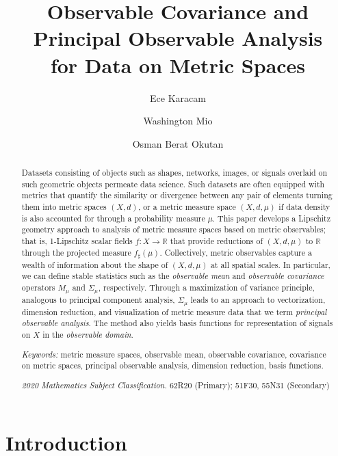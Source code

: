\documentclass[11pt]{article}
\theoremstyle{definition}
\newcommand{\real}{\ensuremath{\mathbb{R}}}
\begin{document}
\title{Observable Covariance and Principal Observable Analysis \\ for Data on Metric Spaces}
\author[1]{Ece Karacam}
\author[1]{Washington Mio}
\author[2]{Osman Berat Okutan}
\date{ }

\maketitle

\begin{abstract}
Datasets consisting of objects such as shapes, networks, images, or signals overlaid on such geometric objects permeate data science. Such datasets are often equipped with metrics that quantify the similarity or divergence between any pair of elements turning them into metric spaces $(X,d)$, or a metric measure space $(X,d,\mu)$ if data density is also accounted for through a probability measure $\mu$. This paper develops a Lipschitz geometry approach to analysis of metric measure spaces based on metric observables; that is, 1-Lipschitz scalar fields $f \colon X \to \real$ that provide reductions of $(X,d,\mu)$ to $\real$ through the projected measure $f_\sharp (\mu)$. Collectively, metric observables capture a wealth of information about the shape of $(X,d,\mu)$ at all spatial scales. In particular, we can define stable statistics such as the {\em observable mean} and {\em observable covariance} operators $M_\mu$ and $\Sigma_\mu$, respectively. Through a maximization of variance principle, analogous to principal component analysis, $\Sigma_\mu$ leads to an approach to vectorization, dimension reduction, and visualization of metric measure data that we term {\em principal observable analysis}. The method also yields basis functions for representation of signals on $X$ in the {\em observable domain}.

\bigskip
\noindent
{\em Keywords:} metric measure spaces, observable mean, observable covariance, covariance on metric spaces, principal observable analysis, dimension reduction, basis functions.

\medskip
\noindent
{\em 2020 Mathematics Subject Classification.} 62R20 (Primary); 51F30, 55N31 (Secondary)
\end{abstract}

\medskip

\section{Introduction}
\end{document}
